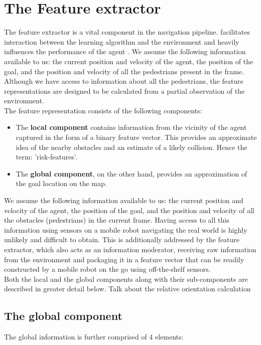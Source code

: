 \section{The Feature extractor}
The feature extractor is a vital component in the navigation pipeline.  facilitates interaction between the learning algorithm and the environment and heavily influences the performance of the agent \cite{vasquez_inverse_2014}. We assume the following information available to us: the current position and velocity of the agent, the position of the goal, and the position and velocity of all the pedestrians present in the frame. Although we have access to information about all the pedestrians, the feature representations are designed to be calculated from a partial observation of the environment.\\
The feature representation consists of the following components:
\begin{itemize}
    \item The \textbf{local component} contains information from the vicinity of the agent captured in the form of a binary feature vector. This provides an approximate idea of the nearby obstacles and an estimate of a likely collision. Hence the term: 'risk-features'. 
    \item The \textbf{global component}, on the other hand, provides an approximation of the goal location on the map. 
\end{itemize}
 We assume the following information available to us: the current position and velocity of the agent, the position of the goal, and the position and velocity of all the obstacles (pedestrians) in the current frame.  Having access to all this information using sensors on a mobile robot navigating the real world is highly unlikely and difficult to obtain. This is additionally addressed by the feature extractor, which also acts as an information moderator, receiving raw information from the environment and packaging it in a feature vector that can be readily constructed by a mobile robot on the go using off-the-shelf sensors.\\
 Both the local and the global components along with their sub-components are described in greater detail below.
Talk about the relative orientation calculation


\subsection*{The global component}
The global information is further comprised of 4 elements: 

